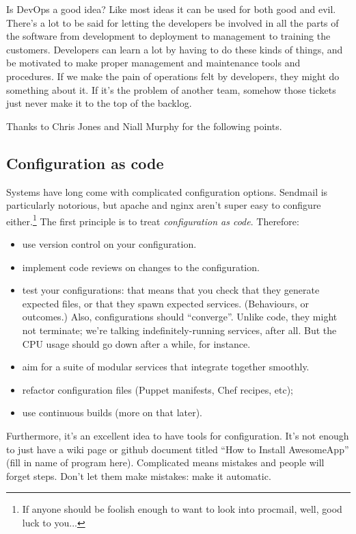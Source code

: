 \documentclass[a4paper]{report}
\begin{document}
Is DevOps a good idea? Like most ideas it can be used for both good and evil. There's a lot to be said for letting the developers be involved in all the parts of the software from development to deployment to management to training the customers. Developers can learn a lot by having to do these kinds of things, and be motivated to make proper management and maintenance tools and procedures. If we make the pain of operations felt by developers, they might do something about it. If it's the problem of another team, somehow those tickets just never make it to the top of the backlog.

Thanks to Chris Jones and Niall Murphy for the following points.

\subsection*{Configuration as code}
Systems have long come with complicated configuration options.
Sendmail is particularly notorious, but apache and nginx aren't super
easy to configure either.\footnote{If anyone should be foolish enough to want to look into procmail, well, good luck to you...} The first principle is to treat \emph{configuration as code}. 
Therefore:
\begin{itemize}
\item use version control on your configuration.
\item implement code reviews on changes to the configuration.
\item test your configurations: that means that you check that they
  generate expected files, or that they spawn expected
  services. (Behaviours, or outcomes.) Also, configurations should
  ``converge''. Unlike code, they might not terminate; we're talking
  indefinitely-running services, after all. But the CPU usage should
  go down after a while, for instance.
\item aim for a suite of modular services that integrate together smoothly.
\item refactor configuration files (Puppet manifests, Chef recipes, etc);
\item use continuous builds (more on that later).
\end{itemize}

Furthermore, it's an excellent idea to have tools for configuration. It's not enough to just have a wiki page or github document titled ``How to Install AwesomeApp'' (fill in name of program here). Complicated means mistakes and people will forget steps. Don't let them make mistakes: make it automatic.
\end{document}
